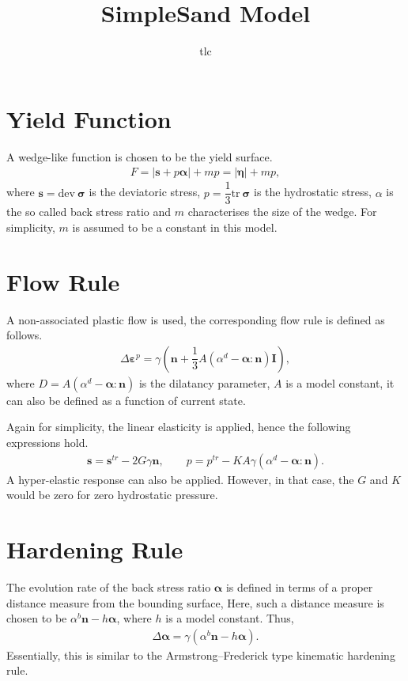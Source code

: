 \documentclass[11pt,fleqn,3p]{elsarticle}
\title{SimpleSand Model}\date{}\author{tlc}
\newcommand*{\tr}[1]{\mathrm{tr}~#1}
\newcommand*{\dev}[1]{\mathrm{dev}~#1}
\begin{document}
\pagestyle{empty}
\section{Yield Function}
A wedge-like function is chosen to be the yield surface.
\begin{gather*}
F=\big|\mathbold{s}+p\mathbold{\alpha}\big|+mp=\big|\mathbold{\eta}\big|+mp,
\end{gather*}
where $\mathbold{s}=\dev{\mathbold{\sigma}}$ is the deviatoric stress, $p=\dfrac{1}{3}\tr{\mathbold{\sigma}}$ is the hydrostatic stress, $\alpha$ is the so called back stress ratio and $m$ characterises the size of the wedge. For simplicity, $m$ is assumed to be a constant in this model.
\section{Flow Rule}
A non-associated plastic flow is used, the corresponding flow rule is defined as follows.
\begin{gather*}
\Delta\mathbold{\varepsilon}^p=\gamma\left(\mathbold{n}+\dfrac{1}{3}A\left(\alpha^d-\mathbold{\alpha}:\mathbold{n}\right)\mathbold{I}\right),
\end{gather*}
where $D=A\left(\alpha^d-\mathbold{\alpha}:\mathbold{n}\right)$ is the dilatancy parameter, $A$ is a model constant, it can also be defined as a function of current state.

Again for simplicity, the linear elasticity is applied, hence the following expressions hold.
\begin{gather*}
\mathbold{s}=\mathbold{s}^{tr}-2G\gamma\mathbold{n},\qquad
p=p^{tr}-KA\gamma\left(\alpha^d-\mathbold{\alpha}:\mathbold{n}\right).
\end{gather*}
A hyper-elastic response can also be applied. However, in that case, the $G$ and $K$ would be zero for zero hydrostatic pressure.
\section{Hardening Rule}
The evolution rate of the back stress ratio $\mathbold{\alpha}$ is defined in terms of a proper distance measure from the bounding surface, Here, such a distance measure is chosen to be $\alpha^b\mathbold{n}-h\mathbold{\alpha}$, where $h$ is a model constant. Thus,
\begin{gather*}
\Delta\mathbold{\alpha}=\gamma{}\left(\alpha^b\mathbold{n}-h\mathbold{\alpha}\right).
\end{gather*}
Essentially, this is similar to the Armstrong--Frederick type kinematic hardening rule.
\end{document}
